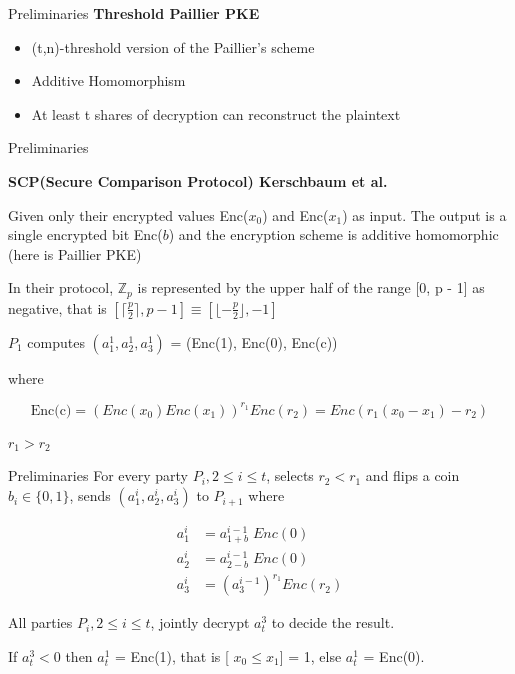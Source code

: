 \begin{frame}{Preliminaries}
    \textbf{Threshold Paillier PKE}

    \begin{itemize}
        \item (t,n)-threshold version of the Paillier's scheme
        \item Additive Homomorphism
        \item At least t shares of decryption can reconstruct the plaintext
    \end{itemize}


\end{frame}

\begin{frame}{Preliminaries}
    
    \textbf{SCP(Secure Comparison Protocol)  Kerschbaum et al. }

    \vspace{0.25cm}

    Given
only their encrypted values Enc($x_0$) and Enc($x_1$) as input.
The output is a single encrypted bit Enc($b$) and the encryption scheme is additive homomorphic (here is Paillier PKE)

\vspace{0.5cm}
    In their protocol, $\mathbb{Z}_p$
is represented by the upper half of the range [0, p - 1] as
negative, that is $[\lceil \frac{p}{2} \rceil, p-1] \equiv [\lfloor -\frac{p}{2} \rfloor, -1]$ 

\vspace{0.5cm}

$P_1$ computes $(a_1^1,a_2^1,a_3^1)$ = (Enc(1), Enc(0), Enc(c)) 

where


$$\text{Enc(c)} = (Enc(x_0)Enc(x_1))^{r_1}Enc(r_2) = Enc(r_1(x_0-x_1)-r_2)$$

\centering $r_1>r_2$




\end{frame}

\begin{frame}{Preliminaries}
    For every party $P_i, 2 \leq i \leq t$, selects $r_2 < r_1 $ and flips a coin $b_i \in \{0, 1\}$, sends $(a_1^i,a_2^i,a_3^i)$ to $P_{i+1}$
where 

\begin{align}
    a_1^i &= a_{1+b}^{i-1} \; Enc(0) \nonumber \\
    a_2^i &= a_{2-b}^{i-1}\; Enc(0) \nonumber \\
    a_3^i &= (a_3^{i-1})^{r_1}Enc(r_2)  \nonumber
\end{align}

All parties $P_i, 2 \leq i \leq t$, jointly decrypt $a_t^3$
to decide the result. 

\vspace{0.25cm}

If $a_t^3 < 0$ then $a_t^1$ = Enc(1), that is [ $x_0 \leq x_1$] = 1, else $a_t^1$
= Enc(0).
\end{frame}


